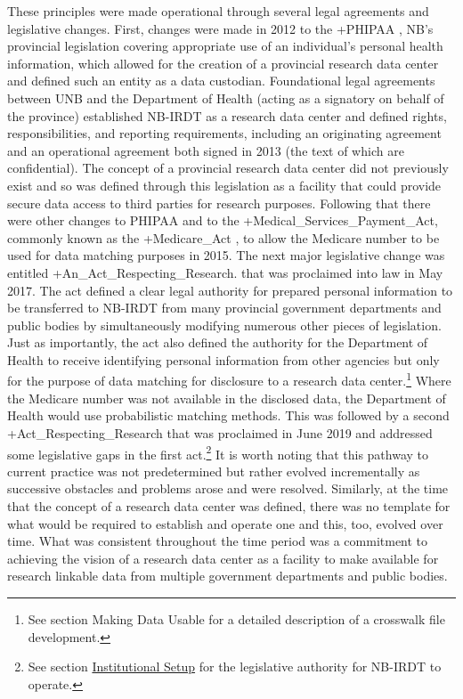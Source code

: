 \documentclass[
]{book}
\begin{document}
These principles were made operational through several legal agreements and legislative changes. First, changes were made in 2012 to the +PHIPAA\textbar{} \citep{governmentofnewbrunswick2009}, NB's provincial legislation covering appropriate use of an individual's personal health information, which allowed for the creation of a provincial research data center and defined such an entity as a data custodian. Foundational legal agreements between UNB and the Department of Health (acting as a signatory on behalf of the province) established NB-IRDT as a research data center and defined rights, responsibilities, and reporting requirements, including an originating agreement and an operational agreement both signed in 2013 (the text of which are confidential). The concept of a provincial research data center did not previously exist and so was defined through this legislation as a facility that could provide secure data access to third parties for research purposes. Following that there were other changes to PHIPAA and to the +Medical\_Services\_Payment\_Act\textbar, commonly known as the +Medicare\_Act\textbar{} \citep{governmentofnewbrunswick2017}, to allow the Medicare number to be used for data matching purposes in 2015. The next major legislative change was entitled +An\_Act\_Respecting\_Research\textbar{}\citep{governmentofnewbrunswick2017a}. that was proclaimed into law in May 2017. The act defined a clear legal authority for prepared personal information to be transferred to NB-IRDT from many provincial government departments and public bodies by simultaneously modifying numerous other pieces of legislation. Just as importantly, the act also defined the authority for the Department of Health to receive identifying personal information from other agencies but only for the purpose of data matching for disclosure to a research data center.\footnote{See section Making Data Usable for a detailed description of a crosswalk file development.} Where the Medicare number was not available in the disclosed data, the Department of Health would use probabilistic matching methods. This was followed by a second +Act\_Respecting\_Research\textbar{} that was proclaimed in June 2019 and addressed some legislative gaps in the first act.\footnote{See section \protect\hyperlink{institutional-setup-8}{Institutional Setup} for the legislative authority for NB-IRDT to operate.} It is worth noting that this pathway to current practice was not predetermined but rather evolved incrementally as successive obstacles and problems arose and were resolved. Similarly, at the time that the concept of a research data center was defined, there was no template for what would be required to establish and operate one and this, too, evolved over time. What was consistent throughout the time period was a commitment to achieving the vision of a research data center as a facility to make available for research linkable data from multiple government departments and public bodies.
\end{document}
